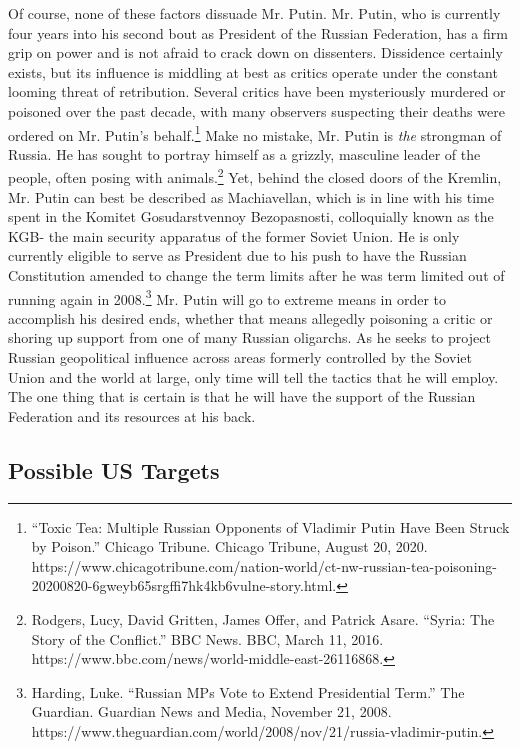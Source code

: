 \documentclass[10pt, letterpaper]{article}
\begin{document}
Of course, none of these factors dissuade Mr. Putin. Mr. Putin, who is
currently four years into his second bout as President of the Russian
Federation, has a firm grip on power and is not afraid to crack down on
dissenters. Dissidence certainly exists, but its influence is middling
at best as critics operate under the constant looming threat of
retribution. Several critics have been mysteriously murdered or poisoned
over the past decade, with many observers suspecting their deaths were
ordered on Mr. Putin's behalf.\footnote{``Toxic Tea: Multiple Russian
  Opponents of Vladimir Putin Have Been Struck by Poison.'' Chicago
  Tribune. Chicago Tribune, August 20, 2020.
  https://www.chicagotribune.com/nation-world/ct-nw-russian-tea-poisoning-20200820-6gweyb65srgffi7hk4kb6vulne-story.html.}
Make no mistake, Mr. Putin is \emph{the} strongman of Russia. He has
sought to portray himself as a grizzly, masculine leader of the people,
often posing with animals.\footnote{Rodgers, Lucy, David Gritten, James
  Offer, and Patrick Asare. ``Syria: The Story of the Conflict.'' BBC
  News. BBC, March 11, 2016.
  https://www.bbc.com/news/world-middle-east-26116868.} Yet, behind the
closed doors of the Kremlin, Mr. Putin can best be described as
Machiavellan, which is in line with his time spent in the Komitet
Gosudarstvennoy Bezopasnosti, colloquially known as the KGB- the main
security apparatus of the former Soviet Union. He is only currently
eligible to serve as President due to his push to have the Russian
Constitution amended to change the term limits after he was term limited
out of running again in 2008.\footnote{Harding, Luke. ``Russian MPs Vote
  to Extend Presidential Term.'' The Guardian. Guardian News and Media,
  November 21, 2008.
  https://www.theguardian.com/world/2008/nov/21/russia-vladimir-putin.}
Mr. Putin will go to extreme means in order to accomplish his desired
ends, whether that means allegedly poisoning a critic or shoring up
support from one of many Russian oligarchs. As he seeks to project
Russian geopolitical influence across areas formerly controlled by the
Soviet Union and the world at large, only time will tell the tactics
that he will employ. The one thing that is certain is that he will have
the support of the Russian Federation and its resources at his back. \\

\subsection{Possible US Targets}
\end{document}
